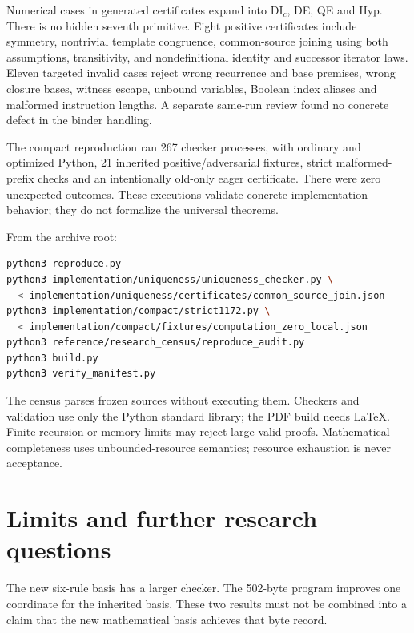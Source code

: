 \documentclass[11pt]{article}
\begin{document}
Numerical cases in generated certificates expand into DI$_c$, DE, QE
and Hyp. There is no hidden seventh primitive. Eight positive
certificates include symmetry, nontrivial template congruence,
common-source joining using both assumptions, transitivity, and
nondefinitional identity and successor iterator laws.
Eleven targeted invalid cases reject wrong recurrence and base premises,
wrong closure bases, witness escape, unbound variables, Boolean index
aliases and malformed instruction lengths. A separate same-run review
found no concrete defect in the binder handling.

The compact reproduction ran 267 checker processes, with ordinary and
optimized Python, 21 inherited positive/adversarial fixtures, strict
malformed-prefix checks and an intentionally old-only eager certificate.
There were zero unexpected outcomes. These executions validate concrete
implementation behavior; they do not formalize the universal theorems.

From the archive root:
\begin{lstlisting}[language=bash]
python3 reproduce.py
python3 implementation/uniqueness/uniqueness_checker.py \
  < implementation/uniqueness/certificates/common_source_join.json
python3 implementation/compact/strict1172.py \
  < implementation/compact/fixtures/computation_zero_local.json
python3 reference/research_census/reproduce_audit.py
python3 build.py
python3 verify_manifest.py
\end{lstlisting}
The census parses frozen sources without executing them. Checkers and
validation use only the Python standard library; the PDF build needs
LaTeX. Finite recursion or memory limits may reject large valid proofs.
Mathematical completeness uses unbounded-resource semantics; resource
exhaustion is never acceptance.

\section{Limits and further research questions}
The new six-rule basis has a larger checker. The 502-byte program improves
one coordinate for the inherited basis. These two results must not be
combined into a claim that the new mathematical basis achieves that
byte record.
\end{document}

